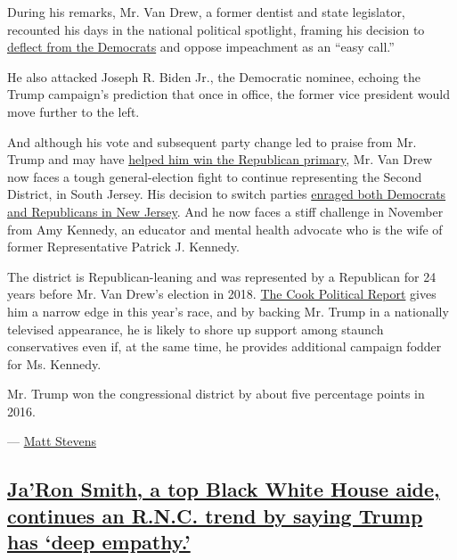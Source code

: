 During his remarks, Mr. Van Drew, a former dentist and state legislator,
recounted his days in the national political spotlight, framing his
decision to
\href{https://www.nytimes3xbfgragh.onion/2019/12/14/us/politics/jeff-van-drew-democrat-republican.html}{deflect
from the Democrats} and oppose impeachment as an ``easy call.''

He also attacked Joseph R. Biden Jr., the Democratic nominee, echoing
the Trump campaign's prediction that once in office, the former vice
president would move further to the left.

And although his vote and subsequent party change led to praise from Mr.
Trump and may have
\href{https://www.nytimes3xbfgragh.onion/interactive/2020/07/07/us/elections/results-new-jersey-house-district-2-primary-election.html}{helped
him win the Republican primary}, Mr. Van Drew now faces a tough
general-election fight to continue representing the Second District, in
South Jersey. His decision to switch parties
\href{https://www.nytimes3xbfgragh.onion/2019/12/16/nyregion/jeff-van-drew-democrat-republican.html}{enraged
both Democrats and Republicans in New Jersey}. And he now faces a stiff
challenge in November from Amy Kennedy, an educator and mental health
advocate who is the wife of former Representative Patrick J. Kennedy.

The district is Republican-leaning and was represented by a Republican
for 24 years before Mr. Van Drew's election in 2018.
\href{https://cookpolitical.com/ratings/house-race-ratings}{The Cook
Political Report} gives him a narrow edge in this year's race, and by
backing Mr. Trump in a nationally televised appearance, he is likely to
shore up support among staunch conservatives even if, at the same time,
he provides additional campaign fodder for Ms. Kennedy.

Mr. Trump won the congressional district by about five percentage points
in 2016.

--- \href{https://www.nytimes3xbfgragh.onion/by/matt-stevens}{Matt
Stevens}

\hypertarget{jaron-smith-a-top-black-white-house-aide-continues-an-rnc-trend-by-saying-trump-has-deep-empathy}{%
\subsection{\texorpdfstring{\protect\hyperlink{jaron-smith-a-top-black-white-house-aide-continues-an-rnc-trend-by-saying-trump-has-deep-empathy}{Ja'Ron
Smith, a top Black White House aide, continues an R.N.C. trend by saying
Trump has `deep
empathy.'}}{Ja'Ron Smith, a top Black White House aide, continues an R.N.C. trend by saying Trump has `deep empathy.'}}\label{jaron-smith-a-top-black-white-house-aide-continues-an-rnc-trend-by-saying-trump-has-deep-empathy}}

